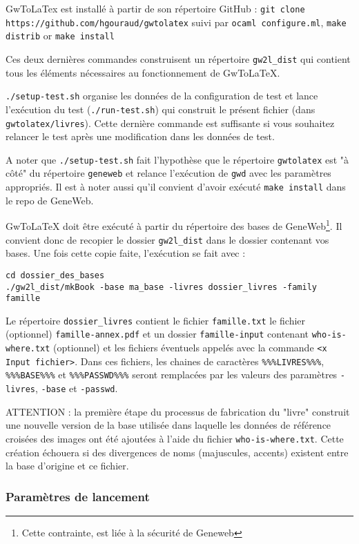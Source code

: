GwToLaTex est installé à partir de son répertoire GitHub :
\verb|git clone https://github.com/hgouraud/gwtolatex|
suivi par
\verb|ocaml configure.ml|, \verb|make distrib| or \verb|make install|

Ces deux dernières commandes construisent un répertoire \verb|gw2l_dist| qui
contient tous les éléments nécessaires au fonctionnement de GwToLaTeX.

\verb|./setup-test.sh| organise les données de la configuration de test et
lance l'exécution du test (\verb|./run-test.sh|) qui construit le présent
fichier (dans \verb|gwtolatex/livres|). Cette dernière commande est
suffisante si vous souhaitez relancer le test après une modification
dans les données de test.

A noter que \verb|./setup-test.sh| fait l'hypothèse que le répertoire
\verb|gwtolatex| est "à côté" du répertoire \verb|geneweb| et relance
l'exécution de \verb|gwd| avec les paramètres appropriés. Il est à noter
aussi qu'il convient d'avoir exécuté \verb|make install| dans le repo de GeneWeb.

GwToLaTeX doit être exécuté à partir du répertoire des bases de
GeneWeb\footnote{Cette contrainte, est liée à la sécurité de Geneweb}.
Il convient donc de recopier le dossier \verb|gw2l_dist| dans le
dossier contenant vos bases. Une fois cette copie faite, l'exécution se
fait avec :
\begin{verbatim}
cd dossier_des_bases
./gw2l_dist/mkBook -base ma_base -livres dossier_livres -family famille
\end{verbatim}

Le répertoire \verb|dossier_livres| contient le fichier \verb|famille.txt|
le fichier (optionnel) \verb|famille-annex.pdf| et un dossier
\verb|famille-input| contenant \verb|who-is-where.txt| (optionnel)
et les fichiers éventuels appelés avec la commande \verb|<x Input fichier>|.
Dans ces fichiers, les chaines de caractères \verb|%%%LIVRES%%%|,
\verb|%%%BASE%%%| et \verb|%%%PASSWD%%%| seront remplacées par les valeurs
des paramètres \verb|-livres|, \verb|-base| et \verb|-passwd|.

ATTENTION : la première étape du processus de fabrication du "livre" construit une 
nouvelle version de la base utilisée dans laquelle les données de référence
croisées des images ont été ajoutées à l'aide du fichier \verb|who-is-where.txt|.
Cette création échouera si des divergences de noms (majuscules, accents) existent
entre la base d'origine et ce fichier.

\subsubsection{Paramètres de lancement}

